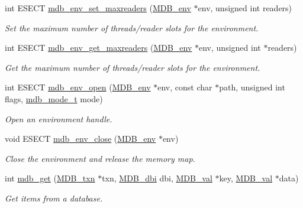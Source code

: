 \begin{DoxyCompactItemize}
int E\+S\+E\+CT \mbox{\hyperlink{group__internal_gaf73a6bb424d2f46c8fda202189b23b9e}{mdb\+\_\+env\+\_\+set\+\_\+maxreaders}} (\mbox{\hyperlink{struct_m_d_b__env}{M\+D\+B\+\_\+env}} $\ast$env, unsigned int readers)
\begin{DoxyCompactList}\small\item\em Set the maximum number of threads/reader slots for the environment. \end{DoxyCompactList}\item 
int E\+S\+E\+CT \mbox{\hyperlink{group__internal_ga70ae94521f18d85d39e3a354267ac489}{mdb\+\_\+env\+\_\+get\+\_\+maxreaders}} (\mbox{\hyperlink{struct_m_d_b__env}{M\+D\+B\+\_\+env}} $\ast$env, unsigned int $\ast$readers)
\begin{DoxyCompactList}\small\item\em Get the maximum number of threads/reader slots for the environment. \end{DoxyCompactList}\item 
int E\+S\+E\+CT \mbox{\hyperlink{group__internal_ga44d5cd326db2e18f12c59c3eca2c1a3a}{mdb\+\_\+env\+\_\+open}} (\mbox{\hyperlink{struct_m_d_b__env}{M\+D\+B\+\_\+env}} $\ast$env, const char $\ast$path, unsigned int flags, \mbox{\hyperlink{lmdb_8h_a6bc5fbe1ea1873df138108acdf04a28d}{mdb\+\_\+mode\+\_\+t}} mode)
\begin{DoxyCompactList}\small\item\em Open an environment handle. \end{DoxyCompactList}\item 
void E\+S\+E\+CT \mbox{\hyperlink{group__internal_ga841fffbcc4b42bb6ae9710201f9f31ab}{mdb\+\_\+env\+\_\+close}} (\mbox{\hyperlink{struct_m_d_b__env}{M\+D\+B\+\_\+env}} $\ast$env)
\begin{DoxyCompactList}\small\item\em Close the environment and release the memory map. \end{DoxyCompactList}\item 
int \mbox{\hyperlink{group__internal_ga8bf10cd91d3f3a83a34d04ce6b07992d}{mdb\+\_\+get}} (\mbox{\hyperlink{struct_m_d_b__txn}{M\+D\+B\+\_\+txn}} $\ast$txn, \mbox{\hyperlink{group__mdb_gadbe68a06c448dfb62da16443d251a78b}{M\+D\+B\+\_\+dbi}} dbi, \mbox{\hyperlink{struct_m_d_b__val}{M\+D\+B\+\_\+val}} $\ast$key, \mbox{\hyperlink{struct_m_d_b__val}{M\+D\+B\+\_\+val}} $\ast$data)
\begin{DoxyCompactList}\small\item\em Get items from a database. \end{DoxyCompactList}\item 

\end{DoxyCompactItemize}
